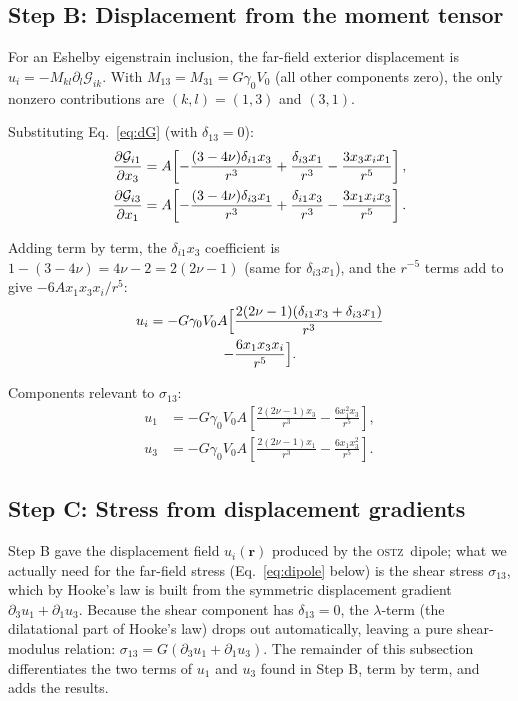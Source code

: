 \documentclass[5p,sort&compress]{elsarticle}
\newcommand{\OSTZ}{\textsc{ostz}}
\newcommand{\gz}{\gamma_0}
\begin{document}
\subsection{Step B: Displacement from the moment tensor}
\label{sec:stepB}

For an Eshelby eigenstrain inclusion, the far-field exterior
displacement is~\cite{eshelby1957,mura1987} $u_i=-M_{kl}\partial_l\mathcal G_{ik}$.
With $M_{13}=M_{31}=G\gz V_0$ (all other components zero),
the only nonzero contributions are $(k,l)=(1,3)$ and $(3,1)$.

Substituting Eq.~\eqref{eq:dG} (with $\delta_{13}=0$):
\begin{align}
  \frac{\partial\mathcal G_{i1}}{\partial x_3}
  &=A\!\left[-\frac{(3-4\nu)\delta_{i1}x_3}{r^3}
    +\frac{\delta_{i3}x_1}{r^3}-\frac{3x_3x_ix_1}{r^5}\right],
    \notag\\
  \frac{\partial\mathcal G_{i3}}{\partial x_1}
  &=A\!\left[-\frac{(3-4\nu)\delta_{i3}x_1}{r^3}
    +\frac{\delta_{i1}x_3}{r^3}-\frac{3x_1x_ix_3}{r^5}\right].
    \notag
\end{align}

Adding term by term, the $\delta_{i1}x_3$ coefficient is
$1-(3-4\nu)=4\nu-2=2(2\nu-1)$ (same for $\delta_{i3}x_1$),
and the $r^{-5}$ terms add to give $-6Ax_1x_3x_i/r^5$:
\begin{multline}
  u_i=-G\gz V_0 A\Bigl[\frac{2(2\nu-1)(\delta_{i1}x_3+\delta_{i3}x_1)}{r^3}
  \\-\frac{6x_1x_3x_i}{r^5}\Bigr].
  \label{eq:ui}
\end{multline}

Components relevant to $\sigma_{13}$:
\begin{align}
  u_1&=-G\gz V_0 A\!\left[\frac{2(2\nu-1)x_3}{r^3}
    -\frac{6x_1^2x_3}{r^5}\right],
    \label{eq:u1}\\
  u_3&=-G\gz V_0 A\!\left[\frac{2(2\nu-1)x_1}{r^3}
    -\frac{6x_1x_3^2}{r^5}\right].
    \label{eq:u3}
\end{align}

\subsection{Step C: Stress from displacement gradients}
\label{sec:stepC}

Step B gave the displacement field $u_i(\mathbf r)$ produced by the
\OSTZ\ dipole; what we actually need for the far-field stress
(Eq.~\eqref{eq:dipole} below) is the shear stress $\sigma_{13}$, which
by Hooke's law is built from the symmetric displacement gradient
$\partial_3u_1+\partial_1u_3$. Because the shear component has
$\delta_{13}=0$, the $\lambda$-term (the dilatational part of Hooke's
law) drops out automatically, leaving a pure shear-modulus relation:
$\sigma_{13}=G(\partial_3u_1+\partial_1u_3)$. The remainder of this
subsection differentiates the two terms of $u_1$ and $u_3$ found in
Step B, term by term, and adds the results.
\end{document}
